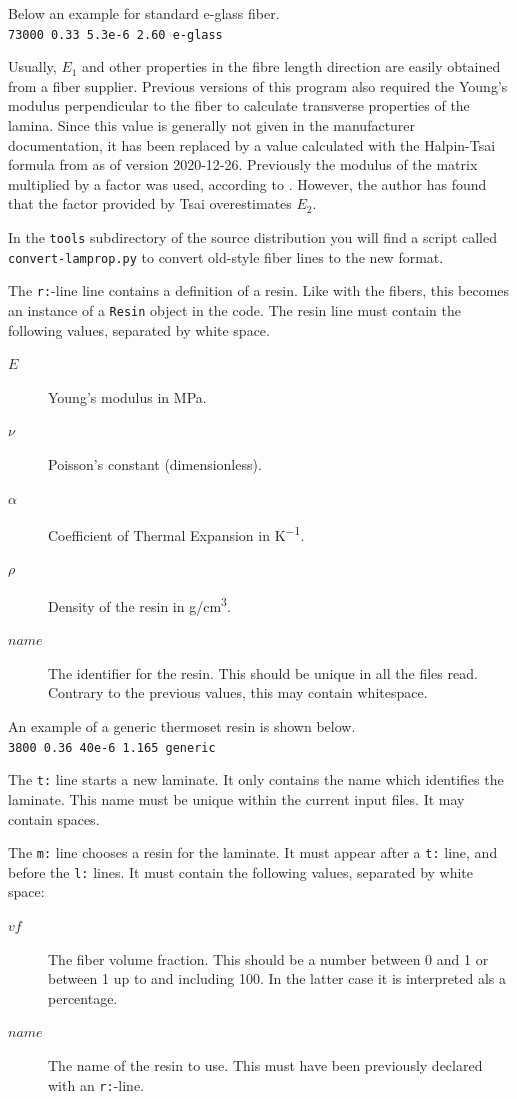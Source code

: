 \documentclass[a4paper,landscape,oneside,11pt,twocolumn]{memoir}
\begin{document}
Below an example for standard e-glass fiber.\\
\texttt{73000 0.33 5.3e-6 2.60 e-glass}

Usually, $E_1$ and other properties in the fibre length direction are easily
obtained from a fiber supplier. Previous versions of this program also
required the Young's modulus perpendicular to the fiber to calculate
transverse properties of the lamina. Since this value is generally not given
in the manufacturer documentation, it has been replaced by
a value calculated with the Halpin-Tsai formula from
\citet[p.  117]{Barbero:2018} as of version 2020-12-26.
Previously the modulus of the matrix multiplied by a factor was used,
according to \citet{Tsai:1992}. However, the author has found that the factor
provided by Tsai overestimates $E_2$.

In the \texttt{tools} subdirectory of the source distribution you will find
a script called \texttt{convert-lamprop.py} to convert old-style fiber lines
to the new format.

The \texttt{r:}-line line contains a definition of a resin. Like with the
fibers, this becomes an instance of a \texttt{Resin} object in the code. The
resin line must contain the following values, separated by white space.
\begin{description}
    \item[$E$] Young's modulus in \si{MPa}.
    \item[$\nu$] Poisson's constant (dimensionless).
    \item[$\alpha$] Coefficient of Thermal Expansion in \si{K^{-1}}.
    \item[$\rho$] Density of the resin in \si{g/cm^3}.
    \item[$name$] The identifier for the resin. This should be unique in all
        the files read. Contrary to the previous values, this may contain
        whitespace.
\end{description}

An example of a generic thermoset resin is shown below.\\
\texttt{3800 0.36 40e-6 1.165 generic}

The \texttt{t:} line starts a new laminate. It only contains the name which
identifies the laminate. This name must be unique within the current input
files. It may contain spaces.

The \texttt{m:} line chooses a resin for the laminate. It must appear after
a \texttt{t:} line, and before the \texttt{l:} lines. It must contain the
following values, separated by white space:
\begin{description}
    \item[$vf$] The fiber volume fraction. This should be a number between
        0 and 1 or between 1 up to and including 100. In the latter case it
        is interpreted als a percentage.
    \item[$name$] The name of the resin to use. This must have been previously
        declared with an \texttt{r:}-line.
\end{description}
\end{document}
